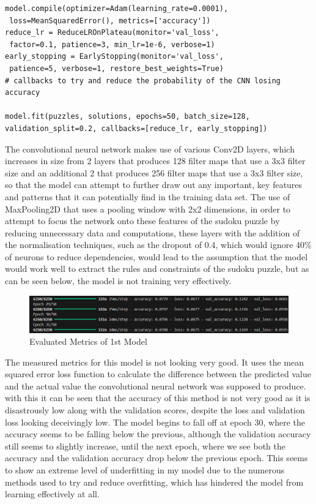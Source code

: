 \documentclass[]{final_report}
\begin{document}
\begin{verbatim}
model.compile(optimizer=Adam(learning_rate=0.0001), 
 loss=MeanSquaredError(), metrics=['accuracy'])
reduce_lr = ReduceLROnPlateau(monitor='val_loss',
 factor=0.1, patience=3, min_lr=1e-6, verbose=1)
early_stopping = EarlyStopping(monitor='val_loss',
 patience=5, verbose=1, restore_best_weights=True)
# callbacks to try and reduce the probability of the CNN losing accuracy

model.fit(puzzles, solutions, epochs=50, batch_size=128, 
validation_split=0.2, callbacks=[reduce_lr, early_stopping])
\end{verbatim}

The convolutional neural network makes use of various Conv2D layers, which increases in size from 2 layers that produces 128 filter maps that use a 3x3 filter size and an additional 2 that produces 256 filter maps that use a 3x3 filter size, so that the model can attempt to further draw out any important, key features and patterns that it can potentially find in the training data set. The use of MaxPooling2D that uses a pooling window with 2x2 dimensions, in order to attempt to focus the network onto these features of the sudoku puzzle by reducing unnecessary data and computations, these layers with the addition of the normalisation techniques, such as the dropout of 0.4, which would ignore 40\% of neurons to reduce dependencies, would lead to the assumption that the model would work well to extract the rules and constraints of the sudoku puzzle, but as can be seen below, the model is not training very effectively. 

\clearpage
\begin{figure}[ht]
    \centering 
    \begin{minipage}{1.1\textwidth} 
        \includegraphics[width=\textwidth]{images/first model metrics.png} 
        \caption{Evaluated Metrics of 1st Model} 
        \label{fig: Evaluated Metrics of 1st Model} 
    \end{minipage} 
    \hfill 
\end{figure}

The measured metrics for this model is not looking very good. It uses the mean squared error loss function to calculate the difference between the predicted value and the actual value the convolutional neural network was supposed to produce. with this it can be seen that the accuracy of this method is not very good as it is disastrously low along with the validation scores, despite the loss and validation loss looking deceivingly low. The model begins to fall off at epoch 30, where the accuracy seems to be falling below the previous, although the validation accuracy still seems to slightly increase, until the next epoch, where we see both the accuracy and the validation accuracy drop below the previous epoch. This seems to show an extreme level of underfitting in my model due to the numerous methods used to try and reduce overfitting, which has hindered the model from learning effectively at all. 
\end{document}
